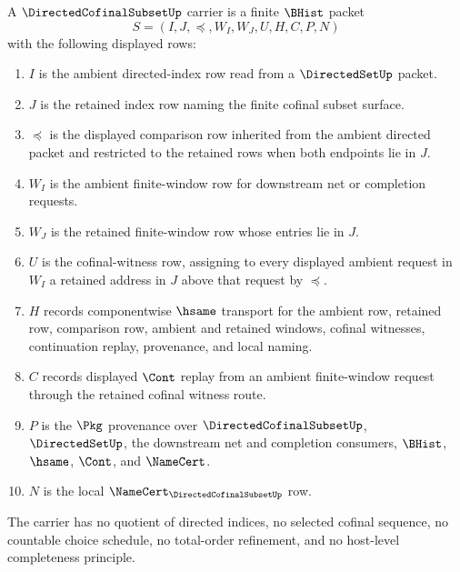 \begin{definition}
\label{def:directed-cofinal-subset-carrier}
A $\DirectedCofinalSubsetUp$ carrier is a finite $\BHist$ packet
$$
S=(I,J,\preceq,W_I,W_J,U,H,C,P,N)
$$
with the following displayed rows:
\begin{enumerate}
\item $I$ is the ambient directed-index row read from a $\DirectedSetUp$ packet.
\item $J$ is the retained index row naming the finite cofinal subset surface.
\item $\preceq$ is the displayed comparison row inherited from the ambient directed packet and restricted to the retained rows when both endpoints lie in $J$.
\item $W_I$ is the ambient finite-window row for downstream net or completion requests.
\item $W_J$ is the retained finite-window row whose entries lie in $J$.
\item $U$ is the cofinal-witness row, assigning to every displayed ambient request in $W_I$ a retained address in $J$ above that request by $\preceq$.
\item $H$ records componentwise $\hsame$ transport for the ambient row, retained row, comparison row, ambient and retained windows, cofinal witnesses, continuation replay, provenance, and local naming.
\item $C$ records displayed $\Cont$ replay from an ambient finite-window request through the retained cofinal witness route.
\item $P$ is the $\Pkg$ provenance over $\DirectedCofinalSubsetUp$, $\DirectedSetUp$, the downstream net and completion consumers, $\BHist$, $\hsame$, $\Cont$, and $\NameCert$.
\item $N$ is the local $\NameCert_{\DirectedCofinalSubsetUp}$ row.
\end{enumerate}
The carrier has no quotient of directed indices, no selected cofinal sequence, no countable choice schedule, no total-order refinement, and no host-level completeness principle.
\end{definition}

